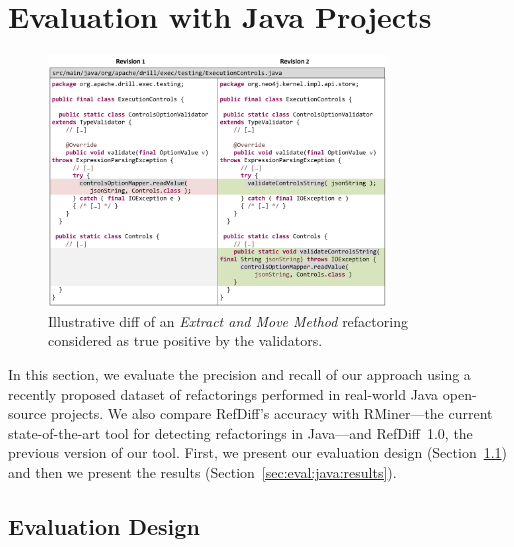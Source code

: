 \section{Evaluation with Java Projects}
\label{sec:eval:java}

\begin{figure}[htb]
\centering
\includegraphics[width=0.8\textwidth]{img/diff3.pdf}
\caption{Illustrative diff of an \emph{Extract and Move Method} refactoring considered as true positive by the validators.}
\label{FigDiff3}
\end{figure}

In this section, we evaluate the precision and recall of our approach using a recently proposed dataset of refactorings performed in real-world Java open-source projects. We also compare RefDiff's accuracy with RMiner---the current state-of-the-art tool for detecting refactorings in Java---and RefDiff~1.0, the previous version of our tool.
First, we present our evaluation design (Section~\ref{sec:eval:java:design}) and then we present the results (Section~\ref{sec:eval:java:results}).

\subsection{Evaluation Design}
\label{sec:eval:java:design}


